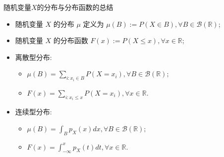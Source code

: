 \documentclass[Prob-All.tex]{subfiles}
\begin{document}
\begin{frame}{随机变量$X$的分布与分布函数的总结}
\begin{itemize}[<+-|alert@+>]
\item 随机变量 $X$ 的分布 $\mu$ 定义为 $\mu(B):=P(X\in B), \forall B\in \mathcal{B}(\mathbb{R})$;
\item 随机变量 $X$ 的分布函数 $F(x):=P(X\leq x), \forall x\in \mathbb{R}$;
\item 离散型分布:
\begin{itemize}[<+-|alert@+>]
\item $\displaystyle \mu(B)=\sum_{i:x_i\in B}P(X=x_i), \forall B\in \mathcal{B}(\mathbb{R});$
\item $\displaystyle F(x)=\sum_{i:x_i\leq x}P(X=x_i),\forall x\in \mathbb{R}$.
\end{itemize}

\item 连续型分布:
\begin{itemize}[<+-|alert@+>]
\item $\displaystyle \mu(B)=\int_{B}p_X(x)dx, \forall B\in \mathcal{B}(\mathbb{R});$
\item $\displaystyle F(x)=\int_{-\infty}^x p_X(t)dt,\forall x\in \mathbb{R}$.
\end{itemize}

\end{itemize}

\end{frame}
% 

% 
% 
%  




\end{document}
